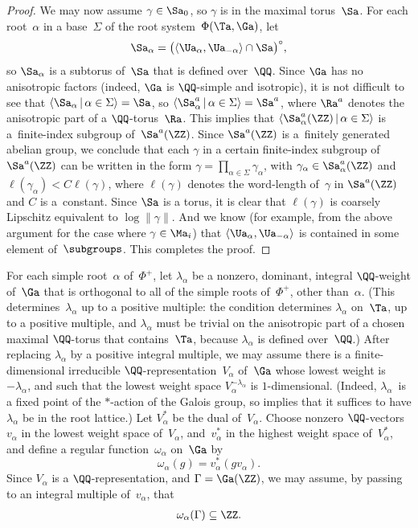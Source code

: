 \begin{proof}
We may now assume $\gamma \in \Sa_0$, so $\gamma$ is in the maximal torus~$\Sa$.
For each root~$\alpha$ in a base~$\Sigma$ of the root system~$\Phi(\Ta, \Ga)$, let
	\[\Sa_\alpha = \bigl( \langle \Ua_\alpha, \Ua_{-\alpha} \rangle \cap \Sa \bigr)^\circ , \]
so $\Sa_\alpha$ is a subtorus of~$\Sa$ that is defined over~$\QQ$. Since $\Ga$ has no anisotropic factors (indeed, $\Ga$ is $\QQ$-simple and isotropic), it is not difficult to see that
	$\langle \Sa_\alpha \,|\, \alpha \in \Sigma \rangle = \Sa$,
so
	$\langle \Sa_\alpha^a \,|\, \alpha \in \Sigma \rangle = \Sa^a$,
where $\Ra^a$ denotes the anisotropic part of a $\QQ$-torus~$\Ra$.
This implies that
	$\langle \Sa_\alpha^a(\ZZ) \,|\, \alpha \in \Sigma \rangle$ is a~finite-index subgroup of~$\Sa^a(\ZZ)$.
Since $\Sa^a(\ZZ)$ is a~finitely generated abelian group, we conclude that each $\gamma$ in a certain finite-index subgroup of $\Sa^a(\ZZ)$ can be written in the form
	$\gamma = \prod\limits_{\alpha \in \Sigma} \gamma_\alpha$,
with $\gamma_\alpha \in \Sa_\alpha^a(\ZZ)$ and $\ell(\gamma_\alpha) < C \ell(\gamma)$, where $\ell(\gamma)$ denotes the word-length of~$\gamma$ in $\Sa^a(\ZZ)$ and $C$ is a~constant. Since $\Sa$ is a torus, it is clear that $\ell(\gamma)$ is coarsely Lipschitz equivalent to $\log \|\gamma\|$. And we know (for example, from the above argument for the case where $\gamma \in \Ma_i$) that $\langle \Ua_\alpha, \Ua_{-\alpha} \rangle$ is contained in some element of~$\subgroups$. This completes the proof.
\end{proof}

\begin{defn}[cf.\ {\cite[p.~44]{MR1828742}}] \label{omegaDefn}
For each simple root~$\alpha$ of~$\Phi^+$, let $\lambda_\alpha$ be a nonzero, dominant, integral $\QQ$-weight of~$\Ga$ that is orthogonal to all of the simple roots of~$\Phi^+$, other than~$\alpha$. (This determines~$\lambda_\alpha$ up to a positive multiple: the condition determines $\lambda_\alpha$ on~$\Ta$, up to a positive multiple, and $\lambda_\alpha$ must be trivial on the anisotropic part of a chosen maximal $\QQ$-torus that contains~$\Ta$, because $\lambda_\alpha$ is defined over~$\QQ$.) After replacing $\lambda_\alpha$ by a positive integral multiple, we may assume there is a finite-dimensional irreducible $\QQ$-representation~$V_\alpha$ of~$\Ga$ whose lowest weight is~$-\lambda_\alpha$, and such that the lowest weight space $V_\alpha^{-\lambda_\alpha}$ is $1$-dimensional. (Indeed, $\lambda_\alpha$~is a fixed point of the $*$-action of the Galois group, so \cite[Theorem~3.3]{MR0277536} implies that it suffices to have $\lambda_\alpha$ be in the root lattice.)
Let $V_\alpha^*$ be the dual of~$V_\alpha$. Choose nonzero $\QQ$-vectors $v_\alpha$ in the lowest weight space of~$V_\alpha$, and~$v_\alpha^*$ in the highest weight space of~$V_\alpha^*$, and define a regular function~$\omega_\alpha$ on~$\Ga$ by
	\[ \omega_\alpha(g) = v_\alpha^*( g v_\alpha) .\]
Since $V_\alpha$ is a $\QQ$-representation, and $\Gamma = \Ga(\ZZ)$, we may assume, by passing to an integral multiple of~$v_\alpha$, that
	\begin{gather} \label{omega(Gamma)}
	 \omega_\alpha(\Gamma) \subseteq \ZZ
	. \end{gather}
\end{defn}

